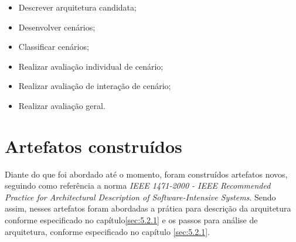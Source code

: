 \begin{itemize}
    \item Descrever arquitetura candidata;
    \item Desenvolver cenários;
    \item Classificar cenários;
    \item Realizar avaliação individual de cenário;
    \item Realizar avaliação de interação de cenário;
    \item Realizar avaliação geral.


\end{itemize}

\section{Artefatos construídos}
Diante do que foi abordado até o momento, foram construídos artefatos novos, seguindo como referência a norma \emph{IEEE 1471-2000 - IEEE Recommended Practice for Architectural Description of Software-Intensive Systems}.
Sendo assim, nesses artefatos foram abordadas a prática para descrição da arquitetura conforme especificado no capítulo\ref{sec:5.2.1} e os passos para análise de arquitetura, conforme especificado no capítulo \ref{sec:5.2.1}.
